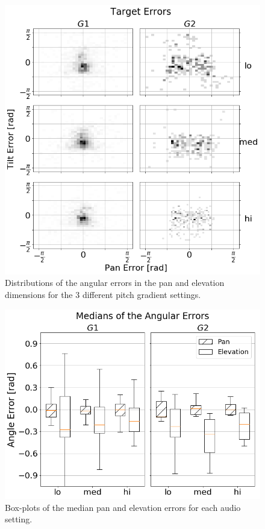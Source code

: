 \documentclass[]{interact}
\begin{document}
\begin{figure}
  \centering
  \includegraphics[width=1.0\textwidth]{figures/target_errors.png}
  \caption{Distributions of the angular errors in the pan and elevation dimensions for the 3 different pitch gradient settings. }\label{fig:target-errors}
\end{figure}

\begin{figure}[t]
  \centering
  \includegraphics[width=1.0\textwidth]{figures/boxplot_target_search_median_error.png}
  \caption{Box-plots of the median pan and elevation errors for each audio setting. }\label{fig:target-boxplot-error}
\end{figure}
\end{document}
